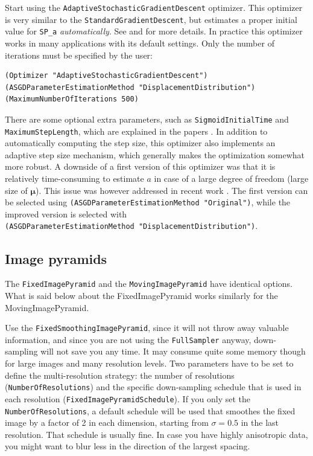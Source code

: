 \documentclass[]{report}
\newcommand{\vmu}{\bm{\mu}}
\begin{document}
Start using the \texttt{AdaptiveStochasticGradientDescent}
optimizer. This optimizer is very similar to the
\texttt{StandardGradientDescent}, but estimates a proper initial
value for \texttt{SP\_a} \emph{automatically}. See \cite{Klein09}
and \cite{Qiao:2016} for more details. In practice this optimizer
works in many applications with its default settings. Only the
number of iterations must be specified by the user:
\begin{verbatim}
(Optimizer "AdaptiveStochasticGradientDescent")
(ASGDParameterEstimationMethod "DisplacementDistribution")
(MaximumNumberOfIterations 500)
\end{verbatim}
There are some optional extra parameters, such as
\texttt{SigmoidInitialTime} and \texttt{MaximumStepLength}, which
are explained in the papers \citep{Klein09,Qiao:2016}. In addition
to automatically computing the step size, this optimizer also
implements an adaptive step size mechanism, which generally makes
the optimization somewhat more robust. A downside of a first version
of this optimizer was that it is relatively time-consuming to
estimate $a$ in case of a large degree of freedom (large size of
$\vmu$). This issue was however addressed in recent work
\citep{Qiao:2016}. The first version can be selected using
\texttt{(ASGDParameterEstimationMethod "Original")}, while the
improved version is selected with\\
\texttt{(ASGDParameterEstimationMethod "DisplacementDistribution")}.

\subsection{Image pyramids}\label{sec:pyramidtuning}

The \texttt{FixedImagePyramid} and the \texttt{MovingImagePyramid}
have identical options. What is said below about the
FixedImagePyramid works similarly for the MovingImagePyramid.

Use the \texttt{FixedSmoothingImagePyramid}, since it will not throw
away valuable information, and since you are not using the
\texttt{FullSampler} anyway, down-sampling will not save you any
time. It may consume quite some memory though for large images and
many resolution levels. Two parameters have to be set to define the
multi-resolution strategy: the number of resolutions
(\texttt{NumberOfResolutions}) and the specific down-sampling
schedule that is used in each resolution
(\texttt{FixedImagePyramidSchedule}). If you only set the
\texttt{NumberOfResolutions}, a default schedule will be used that
smoothes the fixed image by a factor of 2 in each dimension,
starting from $\sigma = 0.5$ in the last resolution. That schedule
is usually fine. In case you have highly anisotropic data, you might
want to blur less in the direction of the largest spacing.
\end{document}
